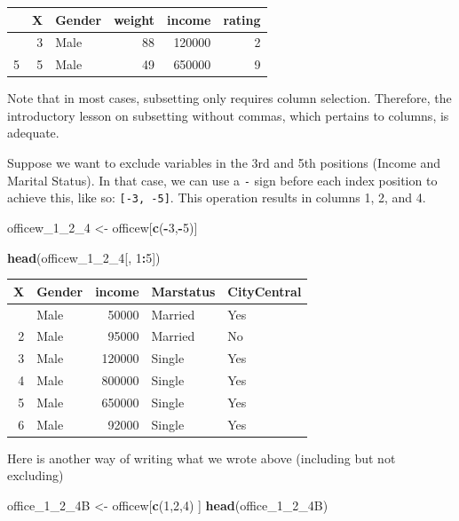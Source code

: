 \documentclass[
]{article}
\newenvironment{Shaded}{\begin{snugshade}}{\end{snugshade}}
\newcommand{\DecValTok}[1]{\textcolor[rgb]{0.00,0.00,0.81}{#1}}
\newcommand{\FunctionTok}[1]{\textcolor[rgb]{0.13,0.29,0.53}{\textbf{#1}}}
\newcommand{\NormalTok}[1]{#1}
\newcommand{\OtherTok}[1]{\textcolor[rgb]{0.56,0.35,0.01}{#1}}
\newcommand{\SpecialCharTok}[1]{\textcolor[rgb]{0.81,0.36,0.00}{\textbf{#1}}}
\begin{document}
\begin{longtable}[]{@{}lrlrrr@{}}
\toprule\noalign{}
& X & Gender & weight & income & rating \\
\midrule\noalign{}
\endhead
\bottomrule\noalign{}
\endlastfoot
3 & 3 & Male & 88 & 120000 & 2 \\
5 & 5 & Male & 49 & 650000 & 9 \\
\end{longtable}

Note that in most cases, subsetting only requires column selection.
Therefore, the introductory lesson on subsetting without commas, which
pertains to columns, is adequate.

Suppose we want to exclude variables in the 3rd and 5th positions
(Income and Marital Status). In that case, we can use a \texttt{-} sign
before each index position to achieve this, like so:
\texttt{{[}-3,\ -5{]}}. This operation results in columns 1, 2, and 4.

\begin{Shaded}
\begin{Highlighting}[]
\NormalTok{officew\_1\_2\_4 }\OtherTok{\textless{}{-}}\NormalTok{ officew[}\FunctionTok{c}\NormalTok{(}\SpecialCharTok{{-}}\DecValTok{3}\NormalTok{,}\SpecialCharTok{{-}}\DecValTok{5}\NormalTok{)]}

\FunctionTok{head}\NormalTok{(officew\_1\_2\_4[, }\DecValTok{1}\SpecialCharTok{:}\DecValTok{5}\NormalTok{])}
\end{Highlighting}
\end{Shaded}

\begin{longtable}[]{@{}rlrll@{}}
\toprule\noalign{}
X & Gender & income & Marstatus & CityCentral \\
\midrule\noalign{}
\endhead
\bottomrule\noalign{}
\endlastfoot
1 & Male & 50000 & Married & Yes \\
2 & Male & 95000 & Married & No \\
3 & Male & 120000 & Single & Yes \\
4 & Male & 800000 & Single & Yes \\
5 & Male & 650000 & Single & Yes \\
6 & Male & 92000 & Single & Yes \\
\end{longtable}

Here is another way of writing what we wrote above (including but not
excluding)

\begin{Shaded}
\begin{Highlighting}[]
\NormalTok{office\_1\_2\_4B }\OtherTok{\textless{}{-}}\NormalTok{ officew[}\FunctionTok{c}\NormalTok{(}\DecValTok{1}\NormalTok{,}\DecValTok{2}\NormalTok{,}\DecValTok{4}\NormalTok{) ]}
\FunctionTok{head}\NormalTok{(office\_1\_2\_4B)}
\end{Highlighting}
\end{Shaded}
\end{document}
